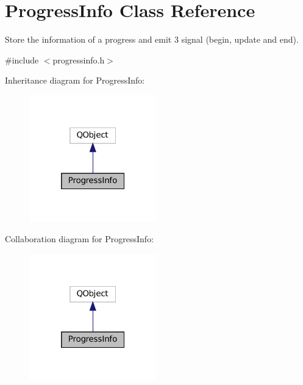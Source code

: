 \hypertarget{class_progress_info}{}\section{Progress\+Info Class Reference}
\label{class_progress_info}


Store the information of a progress and emit 3 signal (begin, update and end).  




{\ttfamily \#include $<$progressinfo.\+h$>$}



Inheritance diagram for Progress\+Info\+:
\nopagebreak
\begin{figure}[H]
\begin{center}
\leavevmode
\includegraphics[width=157pt]{class_progress_info__inherit__graph}
\end{center}
\end{figure}


Collaboration diagram for Progress\+Info\+:
\nopagebreak
\begin{figure}[H]
\begin{center}
\leavevmode
\includegraphics[width=157pt]{class_progress_info__coll__graph}
\end{center}
\end{figure}
